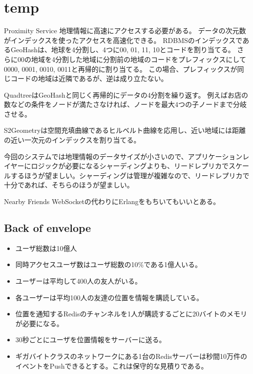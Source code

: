 \documentclass[book]{jlreq}
\begin{document}
\chapter{temp}

\begin{chapter-bib}{Proximity Service}
地理情報に高速にアクセスする必要がある。
データの次元数がインデックスを使ったアクセスを高速化できる。
RDBMSのインデックスであるGeoHashは、地球を4分割し、4つに00, 01, 11, 10とコードを割り当てる。
さらに00の地域を4分割した地域に分割前の地域のコードをプレフィックスにして0000, 0001, 0010, 0011と再帰的に割り当てる。
この場合、プレフィックスが同じコードの地域は近隣であるが、逆は成り立たない\cite{sdi2}。

QuadtreeはGeoHashと同じく再帰的にデータの4分割を繰り返す\cite{quadtree}。
例えばお店の数などの条件をノードが満たさなければ、ノードを最大4つの子ノードまで分岐させる。

S2Geometry\cite{s2geometry}は空間充填曲線であるヒルベルト曲線を応用し、近い地域には距離の近い一次元のインデックスを割り当てる。

今回のシステムでは地理情報のデータサイズが小さいので、アプリケーションレイヤーにロジックが必要になるシャーディングよりも、リードレプリカでスケールするほうが望ましい。シャーディングは管理が複雑なので、リードレプリカで十分であれば、そちらのほうが望ましい。
\end{chapter-bib}
\begin{chapter-bib}{Nearby Friends}
  WebSocketの代わりにErlangをもちいてもいいとある\cite{sdi2}。
  \section{Back of envelope}
  \begin{itemize}
  \item ユーザ総数は10億人
  \item 同時アクセスユーザ数はユーザ総数の10\%である1億人いる。
  \item ユーザーは平均して400人の友人がいる。
  \item 各ユーザーは平均100人の友達の位置を情報を購読している。
  \item 位置を通知するRedisのチャンネルを1人が購読するごとに20バイトのメモリが必要になる。
  \item 30秒ごとにユーザを位置情報をサーバーに送る。
  \item ギガバイトクラスのネットワークにある1台のRedisサーバーは秒間10万件のイベントをPushできるとする。これは保守的な見積りである。
  \end{itemize}
\end{chapter-bib}
\end{document}
